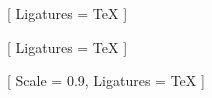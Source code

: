 
\setmainfont{Times New Roman}[
    Ligatures = TeX
]

\setsansfont{Arial}[
    Ligatures = TeX
]

\setmonofont{Courier New}[
    Scale = 0.9,
    Ligatures = TeX
]
